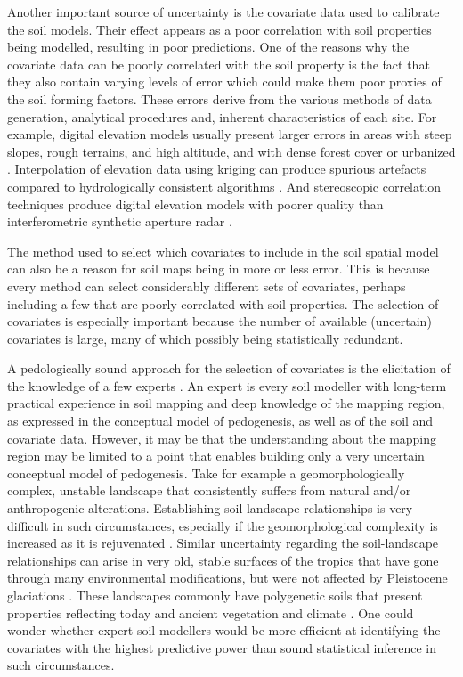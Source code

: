 Another important source of uncertainty is the covariate data used to calibrate the soil models. Their 
effect appears as a poor correlation with soil properties being modelled, resulting in poor predictions.
One of the reasons why the covariate data can be poorly correlated with the soil property is the fact
that they also contain varying levels of error \cite{HeuvelinkEtAl1989} which could make them 
poor proxies of the soil forming factors. These errors derive from the various 
methods of data generation, analytical procedures and, inherent characteristics of
each site. For example, digital elevation models usually present larger errors in areas with steep
slopes, rough terrains, and high altitude, and with dense forest cover or urbanized
\cite{Florinsky1998, Toutin2000, FisherEtAl2006}. Interpolation of elevation data using kriging
can produce spurious artefacts \cite{HenglEtAl2009} compared to hydrologically consistent
algorithms \cite{Hutchinson1989}. And stereoscopic correlation techniques produce digital elevation
models with poorer quality than interferometric synthetic aperture radar \cite{HirtEtAl2010}.

The method used to select which covariates to include in the soil spatial model can also be a reason for
soil maps being in more or less error. This is because every method can select considerably different 
sets of covariates, perhaps including a few that are poorly correlated with soil properties. The selection
of covariates is especially important because the number of available (uncertain) covariates is large, 
many of which possibly being statistically redundant. 

A pedologically sound approach for the selection of covariates is the elicitation of the knowledge of a 
few experts \cite{LarkEtAl2007a, MeyerEtAl2001}. An expert is every soil modeller with long-term 
practical experience in soil mapping \cite{MeyerEtAl2001} and deep knowledge of the mapping 
region, as expressed in the conceptual model of pedogenesis, as well as of the soil and covariate data. 
However, it may be that the understanding about the mapping region may be limited to a point that enables
building only a very uncertain conceptual model of pedogenesis. Take for example a geomorphologically 
complex, unstable landscape that consistently suffers from natural and/or anthropogenic alterations. 
Establishing soil-landscape relationships is very difficult in such circumstances, especially if the 
geomorphological complexity is increased as it is rejuvenated \cite{StreckEtAl2008}. Similar uncertainty
regarding the soil-landscape relationships can arise in very old, stable surfaces of the tropics that have gone
through many environmental modifications, but were not affected by Pleistocene glaciations
\cite{MckenzieEtAl2006}. These landscapes commonly have polygenetic soils that present properties
reflecting today and ancient vegetation and climate \cite{PainEtAl1995, Ker1998}. One could wonder 
whether expert soil modellers would be more efficient at identifying the covariates with the highest 
predictive 
power than sound statistical inference in such circumstances.

